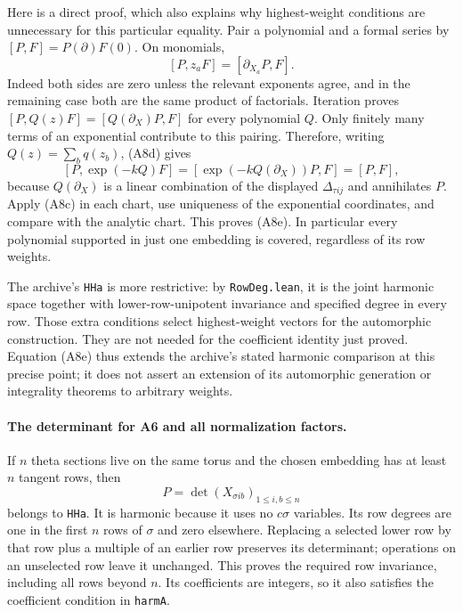 Here is a direct proof, which also explains why highest-weight
conditions are unnecessary for this particular equality.  Pair a
polynomial and a formal series by
$[P,F]=P(\partial)F(0)$.  On monomials,
\[
       [P,z_aF]=[\partial_{X_a}P,F].
\]
Indeed both sides are zero unless the relevant exponents agree,
and in the remaining case both are the same product of
factorials.  Iteration proves
$[P,Q(z)F]=[Q(\partial_X)P,F]$ for every polynomial $Q$.
Only finitely many terms of an exponential contribute to this
pairing.  Therefore, writing $Q(z)=\sum_b q(z_b)$, (A8d) gives
\[
 [P,\exp(-kQ)F]
      =[\exp(-kQ(\partial_X))P,F]=[P,F],
\]
because $Q(\partial_X)$ is a linear combination of the displayed
$\Delta_{\tau ij}$ and annihilates $P$.  Apply (A8c) in each
chart, use uniqueness of the exponential coordinates, and compare
with the analytic chart.  This proves (A8e).  In particular every
polynomial supported in just one embedding is covered, regardless
of its row weights.

The archive's \texttt{HHa} is more restrictive: by
\texttt{RowDeg.lean}, it is the joint harmonic space together with
lower-row-unipotent invariance and specified degree in every row.
Those extra conditions select highest-weight vectors for the
automorphic construction.  They are not needed for the
coefficient identity just proved.  Equation (A8e) thus extends the
archive's stated harmonic comparison at this precise point; it
does not assert an extension of its automorphic generation or
integrality theorems to arbitrary weights.

\paragraph{The determinant for A6 and all normalization factors.}
If $n$ theta sections live on the same torus and the chosen
embedding has at least $n$ tangent rows, then
\[
       P=\det(X_{\sigma i b})_{1\leq i,b\leq n}
 \tag{A8f}
\]
belongs to \texttt{HHa}.  It is harmonic because it uses no
$c\sigma$ variables.  Its row degrees are one in the first $n$
rows of $\sigma$ and zero elsewhere.  Replacing a selected lower
row by that row plus a multiple of an earlier row preserves its
determinant; operations on an unselected row leave it unchanged.
This proves the required row invariance, including all rows beyond
$n$.  Its coefficients are integers, so it also satisfies the
coefficient condition in \texttt{harmA}.

